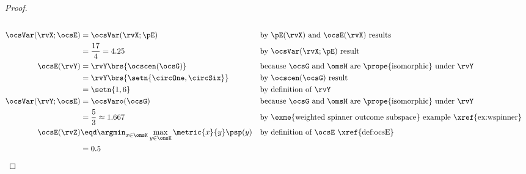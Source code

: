 \begin{tabstr}{0.75}
\begin{proof}
\begin{align*}
      \\
      \ocsVar(\rvX;\ocsE)
        &= \ocsVar(\rvX;\pE)
        && \text{by $\pE(\rvX)$ and $\ocsE(\rvX)$ results}
      \\&= \frac{17}{4}= 4.25
        && \text{by $\ocsVar(\rvX;\pE)$ result}
      \\
      \ocsE(\rvY)
        &= \rvY\brs{\ocscen(\ocsG)}
        && \text{because $\ocsG$ and $\omsH$ are \prope{isomorphic} under $\rvY$}
      \\&= \rvY\brs{\setn{\circOne,\circSix}}
        && \text{by $\ocscen(\ocsG)$ result}
      \\&= \setn{1,6}
        && \text{by definition of $\rvY$}
      \\
      \ocsVar(\rvY;\ocsE)
        &= \ocsVaro(\ocsG)
        && \text{because $\ocsG$ and $\omsH$ are \prope{isomorphic} under $\rvY$}
      \\&= \frac{5}{3} \approx 1.667
        && \text{by \exme{weighted spinner outcome subspace} example \xref{ex:wspinner}}
      \\
      \ocsE(\rvZ)
        &\eqd \argmin_{x\in\omsK}\max_{y\in\omsK}\metric{x}{y}\psp(y)
        && \text{by definition of $\ocsE$ \xref{def:ocsE}}
      \\&= 0.5

\end{align*}
\end{proof}
\end{tabstr}
